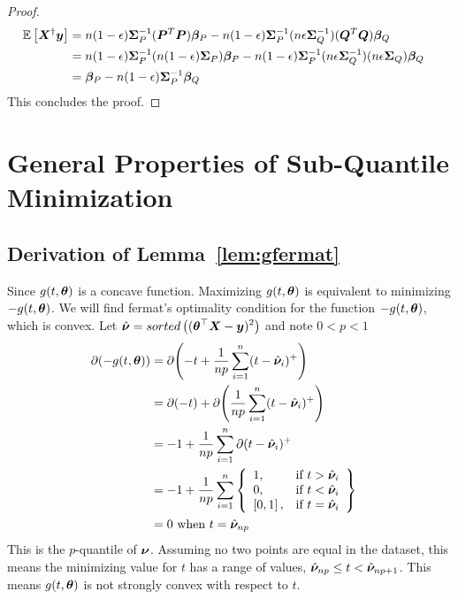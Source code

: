 \documentclass{article} %
\begin{document}
\begin{appendices}
\begin{proof}
	\begingroup
	\addtolength{\jot}{1em}
	\begin{align}
		\mathbb{E}\left[{\bm{X}}^\dagger{\bm{y}}\right] &= n(1-{\epsilon}){\bm{\Sigma}}_P^{-1}({\bm{P}}^T{\bm{P}}){\bm{\beta}}_P - n(1-{\epsilon}){\bm{\Sigma}}_P^{-1}(n{\epsilon}{\bm{\Sigma}}_Q^{-1})({\bm{Q}}^T{\bm{Q}}){\bm{\beta}}_Q &&\\
		&= n(1-{\epsilon}){\bm{\Sigma}}_P^{-1}(n(1-{\epsilon}){\bm{\Sigma}}_P){\bm{\beta}}_P - n(1-{\epsilon}){\bm{\Sigma}}_P^{-1}(n{\epsilon}{\bm{\Sigma}}_Q^{-1})(n{\epsilon}{\bm{\Sigma}}_Q){\bm{\beta}}_Q &&\\
		&= {\bm{\beta}}_P - n(1-{\epsilon}){\bm{\Sigma}}_P^{-1}{\bm{\beta}}_Q &&
	\end{align}
	\endgroup
	This concludes the proof.
	\end{proof}
	
	\newpage
	\section{General Properties of Sub-Quantile Minimization}\label{app:general-proofs}
	\subsection{Derivation of Lemma~\ref{lem:gfermat}}
	\label{app:gfermat}
	Since $\displaystyle g(t,{\bm{\theta}})$ is a concave function. Maximizing $g(t,{\bm{\theta}})$ is equivalent to minimizing $-g(t,{\bm{\theta}})$. We will find fermat's optimality condition for the function $\displaystyle -g(t,{\bm{\theta}})$, which is convex. 
	Let $\displaystyle \hat{{\bm{\nu}}} = sorted\left(({\bm{\theta}}^\top{\bm{X}} - {\bm{y}})^2\right)$ and note $\displaystyle 0 < p < 1$
	\begin{align}
		\partial{\displaystyle (-g(t,\boldsymbol{\theta}})) &= \partial{\left(-t + \frac{1}{np}\sum_{i=1}^{n}(t-\hat{{\bm{\nu}}}_i)^+\right)} &&\\
		&= \partial{(-t)} + \partial{\left(\frac{1}{np}\sum_{i=1}^{n}(t-\hat{{\bm{\nu}}}_i)^+\right)}&&\\
		&= -1 + \frac{1}{np}\sum_{i=1}^{n}\partial{(t-\hat{{\bm{\nu}}}_i)^+} &&\\
		&= -1 + \frac{1}{np}\sum_{i=1}^{n}
		\left\{
		\begin{array}{lr}
			1, & \text{if } t > \hat{{\bm{\nu}}}_i\\
			0, & \text{if } t < \hat{{\bm{\nu}}}_i \\
			\left[0,1\right], & \text{if } t = \hat{{\bm{\nu}}}_i \\
		\end{array}
		\right\}&&\\
		&= 0 \text{ when }\displaystyle t = \hat{{\bm{\nu}}}_{np}&&
	\end{align}
	This is the $p$-quantile of $\displaystyle {\bm{\nu}}$. Assuming no two points are equal in the dataset, this means the minimizing value for $t$ has a range of values, $\hat{{\bm{\nu}}}_{np} \leq t < \hat{{\bm{\nu}}}_{np+1}$. This means $g(t,{\bm{\theta}})$ is not strongly convex with respect to $t$. 

\end{appendices}
\end{document}
